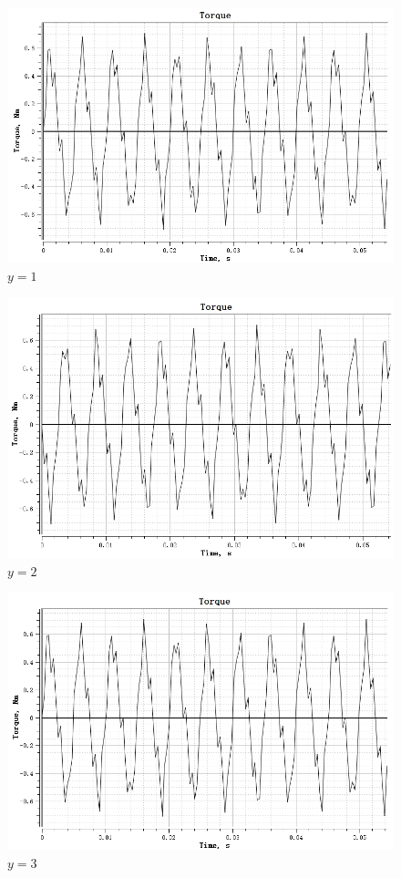\documentclass{thuemp}
\begin{document}
\begin{figure}[H]
  \centering
  \includegraphics[width=1\linewidth]{./img/task2/torque-y1.png}
  \caption{$y=1$}
\end{figure}
\begin{figure}[H]
  \centering
  \includegraphics[width=1\linewidth]{./img/task2/torque-y2.png}
  \caption{$y=2$}
\end{figure}
\begin{figure}[H]
  \centering
  \includegraphics[width=1\linewidth]{./img/task2/torque-y3.png}
  \caption{$y=3$}
\end{figure}
\end{document}
